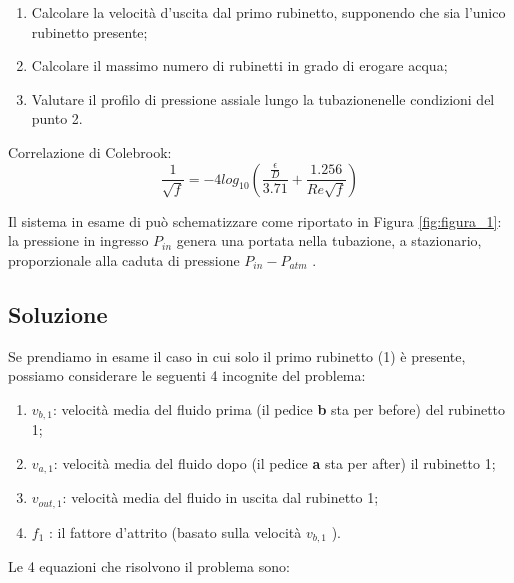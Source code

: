 \documentclass[oneside]{article}
\begin{document}
\begin{enumerate}
    \item Calcolare la velocità d’uscita dal primo rubinetto, supponendo che sia l’unico
       rubinetto presente;
    \item Calcolare il massimo numero di rubinetti in grado di erogare acqua;
    \item Valutare il profilo di pressione assiale lungo la tubazionenelle condizioni del
       punto 2.
\end{enumerate}

Correlazione di Colebrook: 
\begin{equation*}
    \frac{1}{\sqrt{f}} = -4 log_{10} \left(\frac{\frac{\epsilon}{D}}{3.71} +
    \frac{1.256}{Re \sqrt{f}}\right)
\end{equation*}

Il sistema in esame di può schematizzare come riportato in Figura \ref{fig:figura_1}: la
pressione in ingresso $P_{in}$ genera una portata nella tubazione, a stazionario,
proporzionale alla caduta di pressione $P_{in} - P_{atm}$ .

\subsection*{Soluzione}

Se prendiamo in esame il caso in cui solo il primo rubinetto (1) è presente, possiamo
considerare le seguenti 4 incognite del problema:

\begin{enumerate}
    \item $v_{b,1}$: velocità media del fluido prima (il pedice \textbf{b} sta per
       before) del rubinetto 1;
    \item $v_{a,1}$: velocità media del fluido dopo (il pedice \textbf{a} sta per after)
       il rubinetto 1;
    \item $v_{out,1}$: velocità media del fluido in uscita dal rubinetto 1;
    \item $f_{1}$ : il fattore d’attrito (basato sulla velocità $v_{b,1}$ ).
\end{enumerate}

Le 4 equazioni che risolvono il problema sono:
\end{document}
